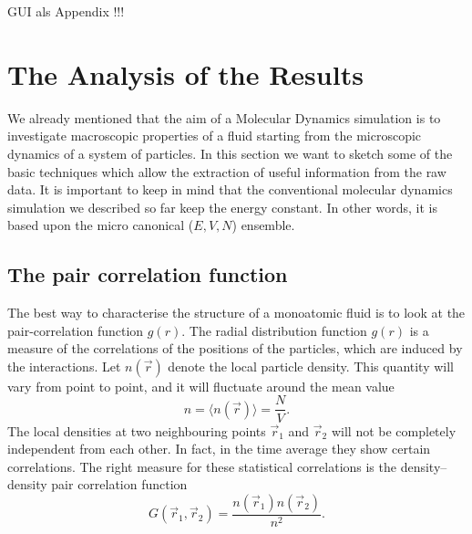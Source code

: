 GUI als Appendix !!!


\section{The Analysis of the Results}
We already mentioned that the aim of a Molecular Dynamics simulation is to
investigate macroscopic properties of a fluid starting from the microscopic
dynamics of a system of particles. In this section we want to sketch some of
the basic techniques which allow the extraction of useful information from the
raw data. It is important to keep in mind that the conventional molecular
dynamics simulation we described so far keep the energy constant. In other
words, it is based upon the micro canonical ($E,V,N$) ensemble.



\subsection{The pair correlation function}
The best way to characterise the structure of a monoatomic fluid is to look at
the pair-correlation function $g(r)$. The radial distribution function $g(r)$
is a measure of the correlations of the positions of the particles, which are 
induced by the interactions. Let $n(\vec{r})$ denote the local particle
density. This quantity will vary from point to point, and it will fluctuate
around the mean value 
\begin{displaymath}
  n = \langle n(\vec{r}) \rangle = \frac{N}{V}.
\end{displaymath}
The local densities at two neighbouring points $\vec{r}_1$ and $\vec{r}_2$
will not be completely independent from each other. In fact, in the time
average they show certain correlations. The right measure for these
statistical correlations is the density--density pair correlation function
\begin{displaymath}
  G(\vec{r}_1,\vec{r}_2) = \frac{n(\vec{r}_1)n(\vec{r}_2)}{n^2}.
\end{displaymath}

